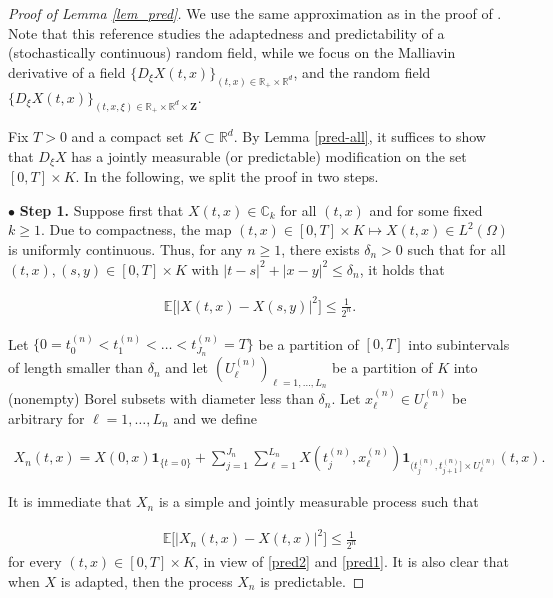 \documentclass[letterpaper, 11pt,  reqno]{amsart}
\newcommand{\noi}{\noindent}
\newcommand{\R}{\mathbb{R}}
\newcommand{\bul}{\bullet}
\newcommand{\bR}{\mathbb{R}}
\newcommand{\E}{\mathbb{E}}
\newcommand{\dl}{\delta}
\renewcommand{\O}{\Omega}
\newcommand{\ind}{\mathbf 1}
\numberwithin{equation}{section}
\numberwithin{theorem}{section}
\begin{document}
\begin{proof}[Proof of Lemma \ref{lem_pred}]
We use the same approximation as in the proof of \cite[Proposition B.1]{BQS}.
Note that this reference  studies the adaptedness and predictability of a 
(stochastically continuous) random field,
while we focus on the Malliavin derivative of a field $\{D_\xi X(t,x)\}_{(t,x)\in\R_+\times\R^d}$,
and the random field 
 $\{D_\xi X(t,x)\}_{( t,x, \xi )\in   \R_+\times\R^d \times \mathbf{Z}}$.


Fix $T>0$ and a compact set $K \subset \bR^d$. 
By Lemma \ref{pred-all}, it suffices to show that $D_{\xi}X$ has a jointly measurable (or predictable) modification on the set $[0,T] \times K$.
In the following, we split the proof in two steps.



\smallskip

$\bul$  {\bf Step 1.} Suppose first that $X(t,x) \in \mathbb{C}_k$ for all $(t,x)$
and  for some fixed $k\geq 1$.  
Due to compactness, 
the map $(t,x)\in [0,T]\times K \mapsto X(t,x)\in L^2(\O)$ is uniformly continuous. 
Thus, for any $n\geq 1$, there exists $\dl_n>0$ such that 
for all $(t,x),(s,y)\in  [0,T]\times K$ with $|t-s|^2+|x-y|^2 \leq \dl_n$,
it holds that

\noi
\begin{align}\label{pred1}
\E\big[|X(t,x)-X(s,y)|^2\big] \leq \frac{1}{2^n}.
\end{align}

\noi
Let $\{0=t_0^{(n)}<t_1^{(n)}<\ldots< t_{J_n}^{(n)}=T\}$ 
be a partition of $[0,T]$ into subintervals of length smaller than $\dl_n$ 
and let  $(U_{\ell}^{(n)})_{\ell=1,\ldots, L_n}$ be a partition of $K$
 into (nonempty) Borel subsets with diameter less than $\dl_n$. 
 Let $x_{\ell}^{(n)} \in U_{\ell}^{(n)}$ be arbitrary for $\ell=1,\ldots,L_n$
 and we define 
  
\noi
\begin{align}\label{pred2}
X_n(t,x)=   X(0,x)\ind_{\{ t=0 \}} + 
\sum_{j=1}^{J_n}\sum_{\ell=1}^{L_n}X(t_j^{(n)},x_{\ell}^{(n)})
\ind_{(t_{j}^{(n)},t_{j+1}^{(n)}] \times U_{\ell}^{(n)}}(t,x).
\end{align}

\noi
It is immediate that $X_n$ is a simple and  jointly measurable  process    such that 

\noi
\begin{align}
\label{E-Xn}
\E\big[|X_n(t,x)-X(t,x)|^2\big]   \leq \frac{1}{2^n}
\end{align}
for every $(t,x)\in [0, T]\times K$,
in view of \eqref{pred2} and \eqref{pred1}. 
It is also clear that when   $X$ is adapted, 
then the process  $X_n$ is predictable.  




\end{proof}
\end{document}

